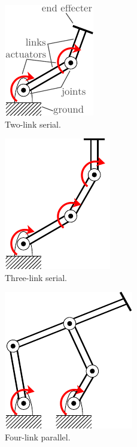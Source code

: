\begin{figure}
\centering
\begin{subfigure}[t]{0.22\textwidth}
\centering
	\includegraphics[scale=1]{../ch1/figures/robotarch_a.pdf}
    \caption{Two-link serial.\label{fig:ch1:robotarch_a}}
\end{subfigure}%
\begin{subfigure}[t]{0.22\textwidth}
\centering
	\includegraphics[scale=1]{../ch1/figures/robotarch_b.pdf}
    \caption{Three-link serial.\label{fig:ch1:robotarch_b}}
\end{subfigure}%
\begin{subfigure}[t]{0.25\textwidth}
\centering
	\includegraphics[scale=1]{../ch1/figures/robotarch_c.pdf}
    \caption{Four-link parallel.\label{fig:ch1:robotarch_c}}
\end{subfigure}%
\begin{subfigure}[t]{0.31\textwidth}
\centering

\end{subfigure}
\end{figure}
